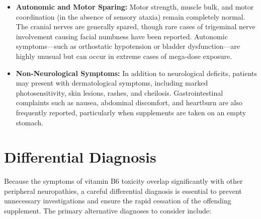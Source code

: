 \begin{itemize}
    \item \textbf{Autonomic and Motor Sparing:} Motor strength, muscle bulk, and motor coordination (in the absence of sensory ataxia) remain completely normal. The cranial nerves are generally spared, though rare cases of trigeminal nerve involvement causing facial numbness have been reported. Autonomic symptoms---such as orthostatic hypotension or bladder dysfunction---are highly unusual but can occur in extreme cases of mega-dose exposure.
    \item \textbf{Non-Neurological Symptoms:} In addition to neurological deficits, patients may present with dermatological symptoms, including marked photosensitivity, skin lesions, rashes, and cheilosis. Gastrointestinal complaints such as nausea, abdominal discomfort, and heartburn are also frequently reported, particularly when supplements are taken on an empty stomach.
\end{itemize}

\section*{Differential Diagnosis}
Because the symptoms of vitamin B6 toxicity overlap significantly with other peripheral neuropathies, a careful differential diagnosis is essential to prevent unnecessary investigations and ensure the rapid cessation of the offending supplement. The primary alternative diagnoses to consider include:

